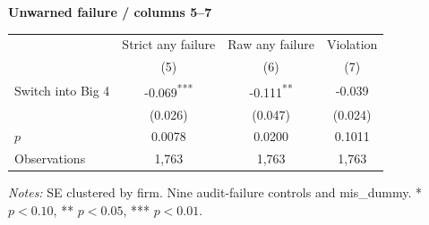 \documentclass[10pt]{article}
\newcommand{\sym}[1]{\textsuperscript{#1}}
\begin{document}
\medskip\textbf{Unwarned failure / columns 5--7}\par\smallskip
\begin{tabular*}{\textwidth}{@{\extracolsep{\fill}}lccc@{}}
\toprule
 & Strict any failure & Raw any failure & Violation \\
 & (5) & (6) & (7) \\
\midrule
Switch into Big 4 & -0.069\sym{***} & -0.111\sym{**} & -0.039 \\
 & (0.026) & (0.047) & (0.024) \\
$p$ & 0.0078 & 0.0200 & 0.1011 \\
Observations & 1,763 & 1,763 & 1,763 \\
\bottomrule\end{tabular*}\par
\medskip\fontsize{9}{11}\selectfont\textit{Notes:} SE clustered by firm. Nine audit-failure controls and mis\_dummy. * $p<0.10$, ** $p<0.05$, *** $p<0.01$.
\end{document}
